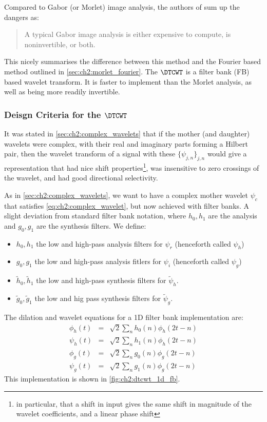   Compared to Gabor (or Morlet) image analysis, the authors of
  \cite{selesnick_dual-tree_2005} sum up the dangers as:
  \begin{quote}
    A typical Gabor image analysis is either expensive to compute, is
    noninvertible, or both.
  \end{quote}
  This nicely summarises the difference between this method and the Fourier
  based method outlined in \autoref{sec:ch2:morlet_fourier}. The $\DTCWT$ is
  a filter bank (FB) based wavelet transform. It is faster
  to implement than the Morlet analysis, as well as being more readily invertible.

\subsubsection{Deisgn Criteria for the $\DTCWT$}
  It was stated in
  \autoref{sec:ch2:complex_wavelets} that if the mother (and daughter) wavelets
  were complex, with their real and imaginary parts forming a Hilbert pair,
  then the wavelet transform of a signal with these $\{\psi_{j,n}\}_{j,n}$
  would give a representation that had nice shift properties\footnote{in
  particular, that a shift in input gives the same shift in magnitude of the
  wavelet coefficients, and a linear phase shift}, was insensitive to zero crossings of the
  wavelet, and had good directional selectivity. 
  
  As in \autoref{sec:ch2:complex_wavelets}, we want to have a complex mother
  wavelet $\psi_c$ that satisfies \eqref{eq:ch2:complex_wavelet}, but now
  achieved with filter banks. A slight deviation from standard filter bank
  notation, where $h_0, h_1$ are the analysis and $g_0,g_1$ are the synthesis
  filters. We define:
  \begin{itemize}
    \item $h_0, h_1$ the low and high-pass analysis filters for $\psi_r$ (henceforth called
      $\psi_h$)
    \item $g_0, g_1$ the low and high-pass analysis fitlers for $\psi_i$
      (henceforth called $\psi_g$)
    \item $\tilde{h}_0, \tilde{h}_1$ the low and high-pass synthesis filters
      for $\tilde{\psi}_h$.
    \item $\tilde{g}_0, \tilde{g}_1$ the low and hig pass synthesis filters for
      $\tilde{\psi}_g$.
  \end{itemize}

  The dilation and wavelet equations for a 1D filter bank implementation are:
  \begin{eqnarray}
    \phi_h(t) & = & \sqrt{2} \sum_n h_0(n) \phi_h(2t-n) \\
    \psi_h(t) & = & \sqrt{2} \sum_n h_1(n) \phi_h(2t-n) \\
    \phi_g(t) & = & \sqrt{2} \sum_n g_0(n) \phi_g(2t-n) \\
    \psi_g(t) & = & \sqrt{2} \sum_n g_1(n) \phi_g(2t-n) 
  \end{eqnarray}
  This implementation is shown in \autoref{fig:ch2:dtcwt_1d_fb}.

